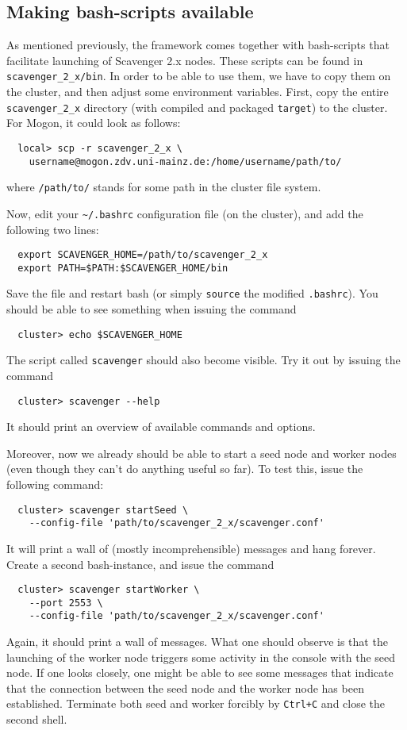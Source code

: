 \documentclass{scrbook}
\begin{document}
\subsection{Making bash-scripts available}
As mentioned previously, the framework comes together with bash-scripts
that facilitate launching of Scavenger 2.x nodes. These scripts can 
be found in \lstinline{scavenger_2_x/bin}. In order to be able to use them, we have to copy them on the cluster, and then adjust some environment variables. First, copy the entire \lstinline{scavenger_2_x} directory (with compiled and packaged \lstinline{target}) to the cluster. For Mogon, it could look
as follows:
\begin{lstlisting}
  local> scp -r scavenger_2_x \
    username@mogon.zdv.uni-mainz.de:/home/username/path/to/
\end{lstlisting}
where \lstinline{/path/to/} stands for some path in the cluster
file system.

Now, edit your \lstinline{~/.bashrc} configuration file (on the cluster), and add the following two lines:
\begin{lstlisting}
  export SCAVENGER_HOME=/path/to/scavenger_2_x
  export PATH=$PATH:$SCAVENGER_HOME/bin
\end{lstlisting}
Save the file and restart bash (or simply \lstinline{source} the
modified \lstinline{.bashrc}).
You should be able to see something when issuing the command 
\begin{lstlisting}
  cluster> echo $SCAVENGER_HOME
\end{lstlisting}
The script called \lstinline{scavenger} should also become visible.
Try it out by issuing the command
\begin{lstlisting}
  cluster> scavenger --help
\end{lstlisting}
It should print an overview of available commands and options.

Moreover, now we already should be able to start a seed node and
worker nodes (even though they can't do anything useful so far).
To test this, issue the following command:

\begin{lstlisting}
  cluster> scavenger startSeed \
    --config-file 'path/to/scavenger_2_x/scavenger.conf'
\end{lstlisting}
It will print a wall of (mostly incomprehensible) messages and hang
forever. Create a second bash-instance, and issue the command
\begin{lstlisting}
  cluster> scavenger startWorker \
    --port 2553 \
    --config-file 'path/to/scavenger_2_x/scavenger.conf'
\end{lstlisting}
Again, it should print a wall of messages. What one should
observe is that the launching of the worker node triggers some
activity in the console with the seed node. If one looks closely,
one might be able to see some messages that indicate that the 
connection between the seed node and the worker node has been 
established. Terminate both seed and worker forcibly by 
\lstinline{Ctrl+C} and close the second shell.
\end{document}
